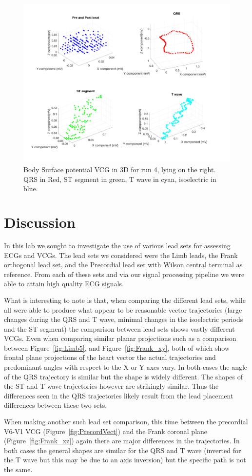 \documentclass[12pt]{article}
\begin{document}
\begin{figure}[H]
	
	\centering
	\includegraphics[width = .75\textwidth]{Figures/BSP_run4_3d.png}
	\caption{Body Surface potential VCG in 3D for run 4, lying on the right. QRS in Red, ST segment in green, T wave in cyan, isoelectric in blue. }
	\label{fig:BSP4}
\end{figure}



\section{Discussion}
\par{}
In this lab we sought to investigate the use of various lead sets for assessing ECGs and VCGs. The lead sets we considered were the Limb leads, the Frank orthogonal lead set, and the Precordial lead set with Wilson central terminal as reference. From each of these sets and via our signal processing pipeline we were able to attain high quality ECG signals. 

\par{}
What is interesting to note is that, when comparing the different lead sets, while all were able to produce what appear to be reasonable vector trajectories (large changes during the QRS and T wave, minimal changes in the isoelectric periods and the ST segment) the comparison between lead sets shows vastly different VCGs. Even when comparing similar planar projections such as a comparison between Figure~\ref{fig:Limb5}, and  Figure~\ref{fig:Frank_xy}, both of which show frontal plane projections of the heart vector the actual trajectories and predominant angles with respect to the X or Y axes vary. In both cases the angle of the QRS trajectory is similar but the shape is widely different. The shapes of the ST and T wave trajectories however are strikingly similar. Thus the differences seen in the QRS trajectories likely result from the lead placement differences between these two sets.
\par{}
When making another such lead set comparison, this time between the precordial V6-V1 VCG (Figure~\ref{fig:PrecordVect}) and the Frank coronal plane (Figure~\ref{fig:Frank_xz}) again there are major differences in the trajectories. In both cases the general shapes are similar for the QRS and T wave (inverted for the T wave but this may be due to an axis inversion) but the specific path is not the same.
\end{document}
